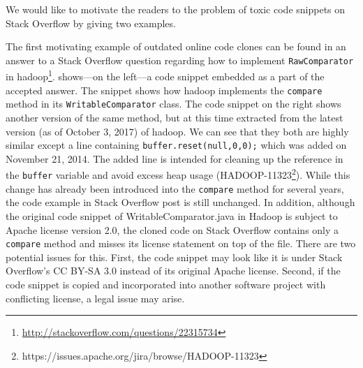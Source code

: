 \documentclass[10pt,journal,compsoc]{IEEEtran}
\begin{document}
We would like to motivate the readers to the problem of toxic code snippets
on Stack Overflow by giving two examples.

The first motivating example of outdated online code clones can be found in an
answer to a Stack Overflow question regarding how to implement
{\small{\texttt{RawComparator}}} in
\textsf{hadoop}\footnote{\url{http://stackoverflow.com/questions/22315734}}.
 shows---on the left---a code snippet embedded as a part
of the accepted answer. The snippet shows how \textsf{hadoop} implements the
{\small{\texttt{compare}}} method in its {\small{\texttt{WritableComparator}}}
class. The code snippet on the right shows another version of the same method,
but at this time extracted from the latest version (as of October 3, 2017) of
\textsf{hadoop}. We can see that they both are highly similar except a line
containing {\small{\verb|buffer.reset(null,0,0);|}} which was added on November
21, 2014. The added line is intended for cleaning up the reference in the
{\small{\verb|buffer|}} variable and avoid excess heap usage
(HADOOP-11323\footnote{https://issues.apache.org/jira/browse/HADOOP-11323}).
While this change has already been introduced into the
{\small{\texttt{compare}}} method for several years, the code example in Stack
Overflow post is still unchanged. 
In addition, although the original code snippet of
WritableComparator.java in Hadoop is subject to Apache license version 2.0, the
cloned code on Stack Overflow contains only a {\small{\texttt{compare}}}
method and misses its license statement on top of the file. There are two
potential issues for this. First, the code snippet may look like it is under
Stack Overflow's CC BY-SA 3.0 instead of its original Apache license. Second, if
the code snippet is copied and incorporated into another software project with
conflicting license, a legal issue may arise.
\end{document}
